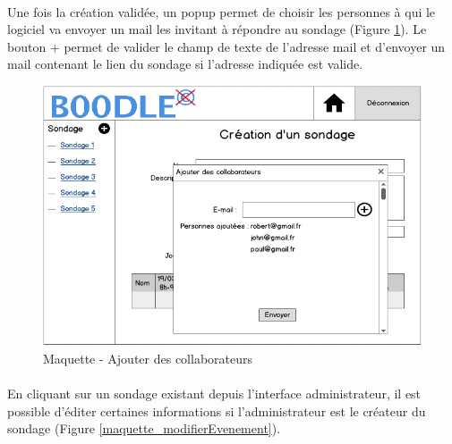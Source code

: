 \documentclass[titlepage]{report}
\begin{document}
\paragraph{}Une fois la création validée, un popup permet de choisir les personnes à qui le logiciel va envoyer un mail les invitant à répondre au sondage (Figure \ref{maquette_popupAddParticipants}). 
Le bouton + permet de valider le champ de texte de l'adresse mail et d'envoyer un mail contenant le lien du sondage si l'adresse indiquée est valide.

\begin{figure}[h]
	\caption{Maquette - Ajouter des collaborateurs}
	\label{maquette_popupAddParticipants}
	\centering
	\includegraphics[scale=0.7]{figures/maquettes/popupAddParticipants.png}
\end{figure}

\paragraph{}En cliquant sur un sondage existant depuis l'interface administrateur, il est possible d'éditer certaines informations si l'administrateur est le créateur du sondage (Figure \ref{maquette_modifierEvenement}).
\end{document}
